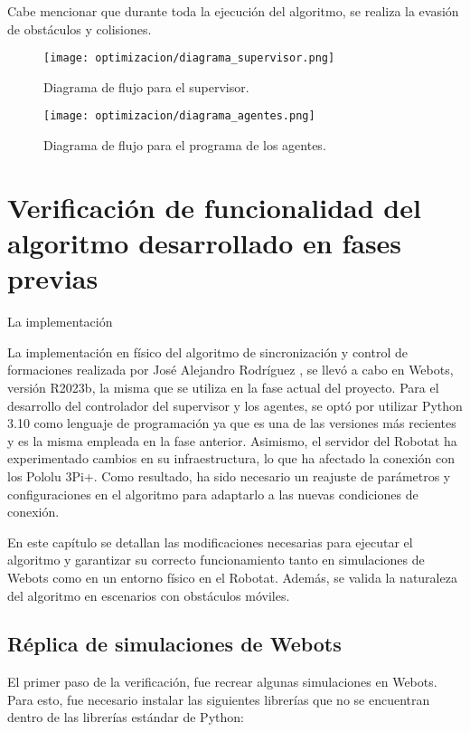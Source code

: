 Cabe mencionar que durante toda la ejecución del algoritmo, se realiza la evasión de obstáculos y colisiones.

\begin{figure}[H]
	\centering
	\texttt{[image: optimizacion/diagrama\_supervisor.png]}
	\caption{Diagrama de flujo para el supervisor.}
	\label{fig:diagrama_supervisor}
\end{figure}

\begin{figure}[H]
	\centering
	\texttt{[image: optimizacion/diagrama\_agentes.png]}
	\caption{Diagrama de flujo para el programa de los agentes.}
	\label{fig:diagrama_agentes}
\end{figure}


\chapter{Verificación de funcionalidad del algoritmo desarrollado en fases previas}\label{cap:restauracion}

La implementación

La implementación en físico del algoritmo de sincronización y control de formaciones realizada por José Alejandro Rodríguez \cite{RodriguezJA_2023_tesis}, se llevó a cabo en Webots, versión R2023b, la misma que se utiliza en la fase actual del proyecto. Para el desarrollo del controlador del supervisor y los agentes, se optó por utilizar Python 3.10 como lenguaje de programación ya que es una de las versiones más recientes y es la misma empleada en la fase anterior. Asimismo, el servidor del Robotat ha experimentado cambios en su infraestructura, lo que ha afectado la conexión con los Pololu 3Pi+. Como resultado, ha sido necesario un reajuste de parámetros y configuraciones en el algoritmo para adaptarlo a las nuevas condiciones de conexión.

En este capítulo se detallan las modificaciones necesarias para ejecutar el algoritmo y garantizar su correcto funcionamiento tanto en simulaciones de Webots como en un entorno físico en el Robotat. Además, se valida la naturaleza del algoritmo en escenarios con obstáculos móviles.


\section{Réplica de simulaciones de Webots}
El primer paso de la verificación, fue recrear algunas simulaciones en Webots. Para esto, fue necesario instalar las siguientes librerías que no se encuentran dentro de las librerías estándar de Python:

